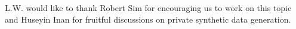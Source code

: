 L.W. would like to thank Robert Sim for encouraging us to work on this topic and Huseyin Inan for fruitful discussions on private synthetic data generation.